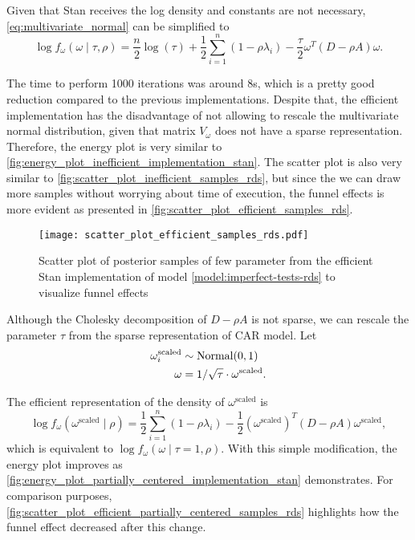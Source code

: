 Given that Stan receives the log density and constants are not necessary,
\eqref{eq:multivariate_normal} can be simplified to
\begin{equation*}
  \log f_{\omega}(\omega \mid \tau, \rho) = \frac{n}{2}\log(\tau) +
  \frac{1}{2}\sum_{i=1}^n(1 - \rho \lambda_i) - \frac{\tau}{2}\omega^T(D - \rho A)\omega.
\end{equation*}

The time to perform 1000 iterations was around 8s, which is a pretty good
reduction compared to the previous implementations. Despite that, the
efficient implementation has the disadvantage of not
allowing to rescale the multivariate normal distribution, given that matrix $V_{\omega}$ does not have
a sparse representation. Therefore, the energy plot is very similar to
\autoref{fig:energy_plot_inefficient_implementation_stan}. The scatter plot is
also very similar to \autoref{fig:scatter_plot_inefficient_samples_rds}, but
since the we can draw more samples without worrying about time of execution,
the funnel effects is more evident as presented in \autoref{fig:scatter_plot_efficient_samples_rds}.

\begin{figure}[htb]
  \centering
  \caption{\label{fig:scatter_plot_efficient_samples_rds}Scatter plot
    of posterior samples of few parameter from the efficient Stan implementation of model
    \eqref{model:imperfect-tests-rds} to visualize funnel effects}
  \texttt{[image: scatter\_plot\_efficient\_samples\_rds.pdf]}
\end{figure}

Although the Cholesky decomposition of $D - \rho A$ is not sparse, we can
rescale the parameter $\tau$ from the sparse representation of CAR model. Let
\begin{align*}
  \omega^{\mathrm{scaled}}_i & \sim \operatorname{Normal}(0,1)                                    \\
  \omega                     & = 1/\sqrt{\tau} \cdot \omega^{\mathrm{scaled}}.
\end{align*}

The efficient representation of the density of $\omega^{\mathrm{scaled}}$ is
\begin{equation*}
  \log f_{\omega}(\omega^{\mathrm{scaled}} \mid \rho) =
  \frac{1}{2}\sum_{i=1}^n(1 - \rho \lambda_i)
  - \frac{1}{2}(\omega^{\mathrm{scaled}})^T(D - \rho A)\omega^{\mathrm{scaled}},
\end{equation*}
which is equivalent to $\log f_{\omega}(\omega \mid \tau=1, \rho)$. With this
simple modification, the energy plot improves as
\autoref{fig:energy_plot_partially_centered_implementation_stan} demonstrates.
For comparison purposes,
\autoref{fig:scatter_plot_efficient_partially_centered_samples_rds}
highlights how the funnel effect decreased after this change.

